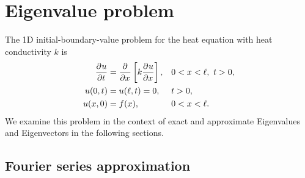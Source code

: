 
\section{Eigenvalue problem}

The 1D initial-boundary-value problem for the heat equation with heat conductivity $k$ is
\begin{align}
  \label{intro_eigen_pde}
  \frac{\partial^{} u}{\partial t^{} } &= \frac{\partial^{} }{\partial x^{} } \left[ k \frac{\partial^{} u}{\partial x^{} } \right], &&0 < x < \ell,\ t > 0, \\
  \label{intro_eigen_bcs}
  u(0,t) &= u(\ell,t) = 0, &&t > 0, \\
  \label{intro_eigen_ic}
  u(x,0) &= f(x),       &&0 < x < \ell.
\end{align}
We examine this problem in the context of exact and approximate Eigenvalues and Eigenvectors in the following sections.

\subsection{Fourier series approximation}

